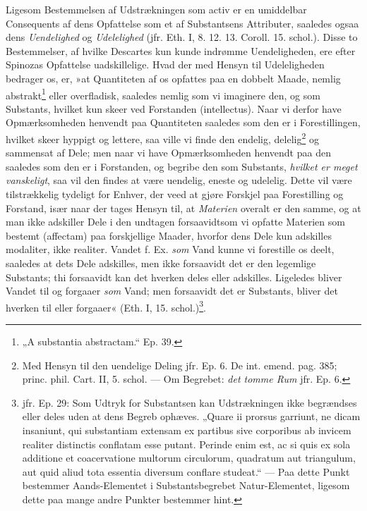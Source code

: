 \documentclass[12pt,a4paper]{book}
\newcommand{\opage}[1]{\marginnote{\footnotesize\textit{[#1]}}}
\begin{document}
\opage{75} \setcounter{footnote}{0}%
Ligesom Bestemmelsen af Udstrækningen som activ er en umiddelbar
Consequents af dens Opfattelse som et af Substantsens Attributer,
saaledes ogsaa dens \emph{Uendelighed} og \emph{Udelelighed} (jfr. Eth. I, 8.
12. 13. Coroll. 15. schol.). Disse to Bestemmelser, af hvilke
Descartes kun kunde indrømme Uendeligheden, ere efter Spinozas
Opfattelse uadskillelige. Hvad der med Hensyn til Udeleligheden
bedrager os, er, »at Quantiteten af os opfattes paa en dobbelt
Maade, nemlig abstrakt\footnote{„A substantia abstractam.“ Ep.
39.} eller overfladisk, saaledes nemlig som vi imaginere den, og
som Substants, hvilket kun skeer ved Forstanden (intellectus).
Naar vi derfor have Opmærksomheden henvendt paa Quantiteten
saaledes som den er i Forestillingen, hvilket skeer hyppigt og
lettere, saa ville vi finde den endelig, delelig\footnote{Med
Hensyn til den uendelige Deling jfr. Ep. 6. De int. emend. pag.
385; princ. phil. Cart. II, 5. schol. --- Om Begrebet: \emph{det tomme
Rum} jfr. Ep. 6.} og sammensat af Dele; men naar vi have
Opmærksomheden henvendt paa den saaledes som den er i Forstanden,
og begribe den som Substants, \emph{hvilket er meget vanskeligt}, saa
vil den findes at være uendelig, eneste og udelelig. Dette vil
være tilstrækkelig tydeligt for Enhver, der veed at gjøre
Forskjel paa Forestilling og Forstand, især naar der tages
Hensyn til, at \emph{Materien} overalt er den samme, og at man ikke
adskiller Dele i den undtagen forsaavidtsom vi opfatte Materien
som bestemt (affectam) paa forskjellige Maader, hvorfor dens Dele
kun adskilles modaliter, ikke realiter. Vandet f. Ex. \emph{som} Vand
kunne vi forestille os deelt, saaledes at dets Dele adskilles,
men ikke forsaavidt det er den legemlige Substants; thi
forsaavidt kan det hverken deles eller adskilles. Ligeledes
bliver Vandet til og forgaaer \emph{som} Vand; men forsaavidt det er
Substants, bliver det hverken til eller forgaaer« (Eth. I, 15.
schol.)\footnote{jfr. Ep. 29: Som Udtryk for Substantsen kan
Udstrækningen ikke begrændses eller deles uden at dens Begreb
ophæves. „Quare ii prorsus garriunt, ne dicam insaniunt, qui
substantiam extensam ex partibus sive corporibus ab invicem
realiter distinctis conflatam esse putant. Perinde enim est, ac
si quis ex sola additione et coacervatione multorum circulorum,
quadratum aut triangulum, aut quid aliud tota essentia diversum
conflare studeat.“ --- Paa dette Punkt bestemmer Aands-Elementet
i Substantsbegrebet Natur-Elementet, ligesom dette paa mange
andre Punkter bestemmer hint.
}.
\end{document}
